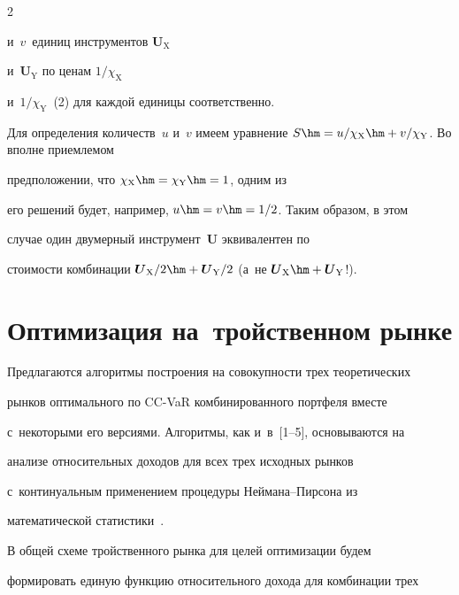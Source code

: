 \begin{multicols}{2}
\begin{enumerate}[(1)]
и~$v$~единиц инструментов $\boldsymbol{U}_{\mathrm{X}}$ 


и~$\boldsymbol{U}_{\mathrm{Y}}$ по ценам $1/\chi_{\mathrm{X}}$ 


и~$1/\chi_{\mathrm{Y}}$~(2) для каждой единицы соответственно. 


  \end{enumerate}


  


  Для определения количеств~$u$ и~$v$ имеем уравнение $S \hm= 


u/\chi_{\mathrm{X}}\hm + v/\chi_{\mathrm{Y}}$. Во вполне приемлемом 


предположении, что $\chi_{\mathrm{X}}\hm = \chi_{\mathrm{Y}}\hm = 1$, одним из 


его решений будет, например, $u \hm= v \hm= 1/2$. Таким образом, в этом 


случае один двумерный инструмент~$\boldsymbol{U}$ эквивалентен по 


стоимости комбинации $\boldsymbol{U}_{\mathrm{X}}/2\hm+ 


\boldsymbol{U}_{\mathrm{Y}}/2$ (а~не $\boldsymbol{U}_{\mathrm{X}}\hm + 


\boldsymbol{U}_{\mathrm{Y}}$!). 


  


  \section{Оптимизация на~тройственном рынке}


  


  Предлагаются алгоритмы построения на совокупности трех теоретических 


рынков оптимального по CC-VaR комбинированного портфеля вместе 


с~некоторыми его версиями. Алгоритмы, как и~в~[1--5], основываются на 


анализе относительных доходов для всех трех исходных рынков 


с~континуальным применением процедуры Ней\-ма\-на--Пир\-со\-на из 


математической статистики~\cite{6-ag}. 


  


  В общей схеме тройственного рынка для целей оптимизации будем 


формировать единую функцию относительного дохода для комбинации трех 



\end{multicols}
